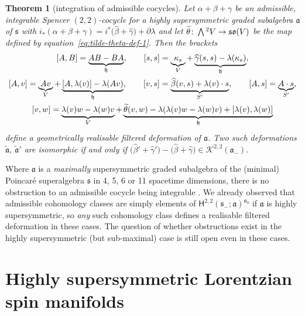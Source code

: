 \documentclass[11pt]{article}
\numberwithin{equation}{section}
\numberwithin{equation}{section}
\newtheorem{Theorem}{Theorem}[section]
\newcommand{\fa}{\mathfrak{a}}
\newcommand{\fh}{\mathfrak{h}}
\newcommand{\fs}{\mathfrak{s}}
\newcommand{\fso}{\mathfrak{so}}
\newcommand{\cK}{\mathcal{K}}
\newcommand{\ssH}{\mathsf{H}}
\newcommand{\betahat}{\widehat{\beta}}
\newcommand{\gammahat}{\widehat{\gamma}}
\newcommand{\thetatilde}{\widetilde{\theta}}
\newcommand{\fatilde}{\widetilde{\fa}}
\newcommand{\Wedge}{\mathchoice{{\textstyle\bigwedge}}{\bigwedge}{\bigwedge}{\bigwedge}}	%
\newcommand{\1}{\mathbbm{1}}
\begin{document}
\begin{Theorem}[integration of admissible cocycles]\label{thm:admiss-coycle-integr}
	Let $\alpha+\beta+\gamma$ be an admissible, integrable Spencer $(2,2)$-cocycle for a highly supersymmetric graded subalgebra $\fa$ of $\fs$ with $i_*(\alpha+\beta+\gamma)=i^*\bigl(\betahat+\gammahat\bigr)+\partial\lambda$ and let $\thetatilde\colon\Wedge^2V\to\fso(V)$ be the map defined by equation~\eqref{eq:tilde-theta-def-1}. Then the brackets
	\begin{gather*}
			\comm{A}{B} = \underbrace{AB-BA}_\fh,\qquad
			\comm{s}{s} = \underbrace{\kappa_s}_V + \underbrace{\gammahat(s,s) - \lambda(\kappa_s)}_\fh,\\
			\comm{A}{v}= \underbrace{Av}_V + \underbrace{\comm{A}{\lambda(v)} - \lambda(Av)}_\fh,\qquad
			\comm{v}{s} = \underbrace{\betahat(v,s) + \lambda(v)\cdot s}_{S'},\qquad
			\comm{A}{s} = \underbrace{A\cdot s}_{S'},
	\\
		\comm{v}{w} = \underbrace{\lambda(v)w-\lambda(w)v}_V + \underbrace{\thetatilde(v,w) - \lambda(\lambda(v)w-\lambda(w)v) + \comm{\lambda(v)}{\lambda(w)}}_\fh \label{eq:admiss-cocycle-brackets}
	\end{gather*}
	define a geometrically realisable filtered deformation of $\fa$. Two such deformations $\fatilde$, $\fatilde'$ are isomorphic if and only if $\bigl(\betahat'+\gammahat'\bigr)-\bigl(\betahat+\gammahat\bigr)\in\cK^{2,2}(\fa_-)$.
\end{Theorem}

Where $\fa$ is a \emph{maximally} supersymmetric graded subalgebra of the (minimal) Poincar\'e superalgebra $\fs$ in 4, 5, 6 or 11 spacetime dimensions, there is no obstruction to an admissible cocycle being integrable \cite{Beckett2021,deMedeiros2016,deMedeiros2018,Figueroa-OFarrill2017}. We already observed that admissible cohomology classes are simply elements of $\ssH^{2,2}(\fs_-;\fa)^{\fa_0}$ if $\fa$ is highly supersymmetric, so \emph{any} such cohomology class defines a realisable filtered deformation in these cases. The question of whether obstructions exist in the highly supersymmetric (but sub-maximal) case is still open even in these cases.

\setcounter{section}{4}
\section{Highly supersymmetric Lorentzian spin manifolds}
\label{sec:high-susy-spin-mfld}
\end{document}
